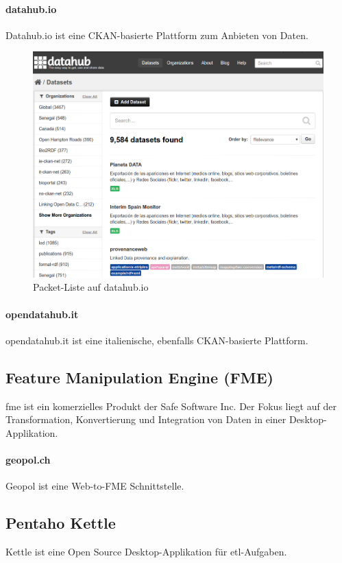 \paragraph{datahub.io}
Datahub.io ist eine CKAN-basierte Plattform zum Anbieten von Daten.

\begin{figure}[H]
    \centering
    \includegraphics[width=2\linewidth/3]{fig/datahub-io}
    \caption{Packet-Liste auf datahub.io}
\end{figure}

\paragraph{opendatahub.it}
opendatahub.it ist eine italienische, ebenfalls CKAN-basierte Plattform.

\subsection{Feature Manipulation Engine (FME)}
\gls{fme} ist ein komerzielles Produkt der Safe Software Inc. Der Fokus liegt auf der Transformation, Konvertierung und Integration von Daten in einer Desktop-Applikation.

\paragraph{geopol.ch}
Geopol ist eine Web-to-FME Schnittstelle.

\subsection{Pentaho Kettle}
Kettle ist eine Open Source Desktop-Applikation für \acs{etl}-Aufgaben.

